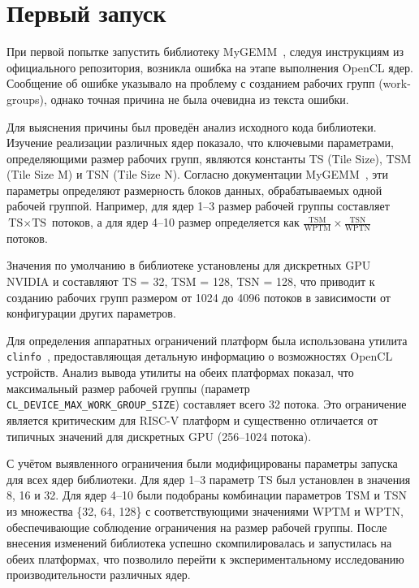 
\section{Первый запуск}

При первой попытке запустить библиотеку MyGEMM~\cite{mygemm_repo}, следуя инструкциям из официального репозитория, возникла ошибка на этапе выполнения OpenCL ядер. Сообщение об ошибке указывало на проблему с созданием рабочих групп (work-groups), однако точная причина не была очевидна из текста ошибки.

Для выяснения причины был проведён анализ исходного кода библиотеки. Изучение реализации различных ядер показало, что ключевыми параметрами, определяющими размер рабочих групп, являются константы TS (Tile Size), TSM (Tile Size M) и TSN (Tile Size N). Согласно документации MyGEMM~\cite{nugteren2018mygemm}, эти параметры определяют размерность блоков данных, обрабатываемых одной рабочей группой. Например, для ядер 1--3 размер рабочей группы составляет $\text{TS} \times \text{TS}$ потоков, а для ядер 4--10 размер определяется как $\frac{\text{TSM}}{\text{WPTM}} \times \frac{\text{TSN}}{\text{WPTN}}$ потоков.

Значения по умолчанию в библиотеке установлены для дискретных GPU NVIDIA и составляют TS = 32, TSM = 128, TSN = 128, что приводит к созданию рабочих групп размером от 1024 до 4096 потоков в зависимости от конфигурации других параметров.

Для определения аппаратных ограничений платформ была использована утилита \texttt{clinfo}~\cite{clinfo}, предоставляющая детальную информацию о возможностях OpenCL устройств. Анализ вывода утилиты на обеих платформах показал, что максимальный размер рабочей группы (параметр \texttt{CL\_DEVICE\_MAX\_WORK\_GROUP\_SIZE}) составляет всего 32 потока. Это ограничение является критическим для RISC-V платформ и существенно отличается от типичных значений для дискретных GPU (256--1024 потока).

С учётом выявленного ограничения были модифицированы параметры запуска для всех ядер библиотеки. Для ядер 1--3 параметр TS был установлен в значения 8, 16 и 32. Для ядер 4--10 были подобраны комбинации параметров TSM и TSN из множества \{32, 64, 128\} с соответствующими значениями WPTM и WPTN, обеспечивающие соблюдение ограничения на размер рабочей группы. После внесения изменений библиотека успешно скомпилировалась и запустилась на обеих платформах, что позволило перейти к экспериментальному исследованию производительности различных ядер.





